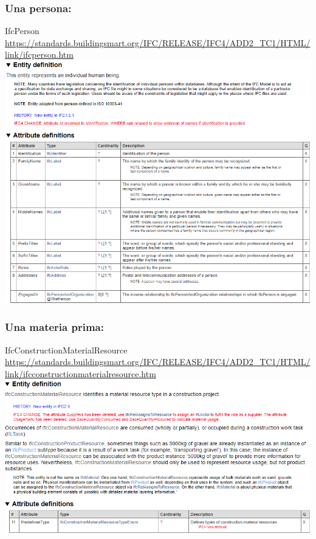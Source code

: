 \documentclass[spanish,12pt,a4paper,final,oneside]{book}
\begin{document}
\subsubsection{Una persona:}
IfcPerson
\\ \url{https://standards.buildingsmart.org/IFC/RELEASE/IFC4/ADD2_TC1/HTML/link/ifcperson.htm}
\\ \includegraphics[width=\textwidth]{Definicion de IfcPerson}

\subsubsection{Una materia prima:}
IfcConstructionMaterialResource
\\ \url{https://standards.buildingsmart.org/IFC/RELEASE/IFC4/ADD2_TC1/HTML/link/ifcconstructionmaterialresource.htm}
\\ \includegraphics[width=\textwidth]{Definicion de IfcConstructionMaterialResource}
\end{document}
